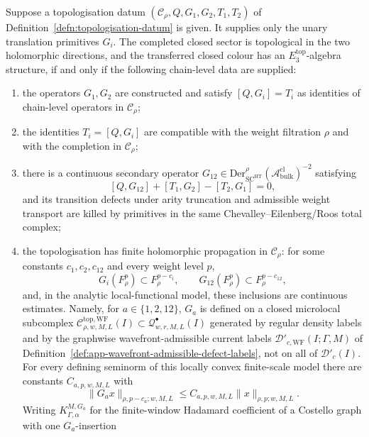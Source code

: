 \begin{thm}
Suppose a topologisation datum \((\mathcal C_\rho,Q,G_1,G_2,T_1,T_2)\)
of Definition~\ref{defn:topologisation-datum} is given.  It supplies
only the unary translation primitives \(G_i\).  The completed closed
sector is topological in the two holomorphic directions, and the
transferred closed colour has an \(E_3^{\mathrm{top}}\)-algebra
structure, if and only if the following chain-level data are supplied:
\begin{enumerate}[label=\textup{(T\arabic*)}]
  \item the operators \(G_1,G_2\) are constructed and satisfy
        \([Q,G_i]=T_i\) as identities of chain-level operators in
        \(\mathcal C_\rho\);
  \item the identities \(T_i=[Q,G_i]\) are compatible with the weight
        filtration \(\rho\) and with the completion in
        \(\mathcal C_\rho\);
  \item there is a continuous secondary operator
        \(G_{12}\in
        \mathrm{Der}^{\rho}_{\mathrm{SC}^{\mathrm{HT}}}
        (\mathcal A^{\mathrm{cl}}_{\mathrm{bulk}})^{-2}\)
        satisfying
        \[
          [Q,G_{12}]+[T_1,G_2]-[T_2,G_1]=0,
        \]
        and its transition defects under arity truncation and admissible
        weight transport are killed by primitives in the same
        Chevalley--Eilenberg/Roos total complex;
  \item the topologisation has finite holomorphic propagation in
        \(\mathcal C_\rho\): for some constants
        \(c_1,c_2,c_{12}\) and every weight level \(p\),
        \[
          G_i(F^p_\rho)\subset F^{p-c_i}_\rho,\qquad
          G_{12}(F^p_\rho)\subset F^{p-c_{12}}_\rho,
        \]
        and, in the analytic local-functional model, these inclusions are
        continuous estimates.  Namely, for \(a\in\{1,2,12\}\), \(G_a\)
        is defined on a closed microlocal subcomplex
        \(\mathcal C^{\mathrm{top,WF}}_{\rho,w,M,L}(I)\subset
        \mathcal Q^\bullet_{w,r,M,L}(I)\) generated by regular density
        labels and by the graphwise wavefront-admissible current labels
        \(\mathcal D'_{c,\mathrm{WF}}(I;\Gamma,M)\) of
        Definition~\ref{def:app-wavefront-admissible-defect-labels}, not
        on all of \(\mathcal D'_c(I)\).  For every defining seminorm of
        this locally convex finite-scale model there are constants
        \(C_{a,p,w,M,L}\) with
        \[
          \|G_a x\|_{\rho,p-c_a;w,M,L}
          \leq C_{a,p,w,M,L}\|x\|_{\rho,p;w,M,L}.
        \]
        Writing \(K^{M,G_a}_{\Gamma,\alpha}\) for the finite-window
        Hadamard coefficient of a Costello graph with one \(G_a\)-insertion

\end{enumerate}
\end{thm}
